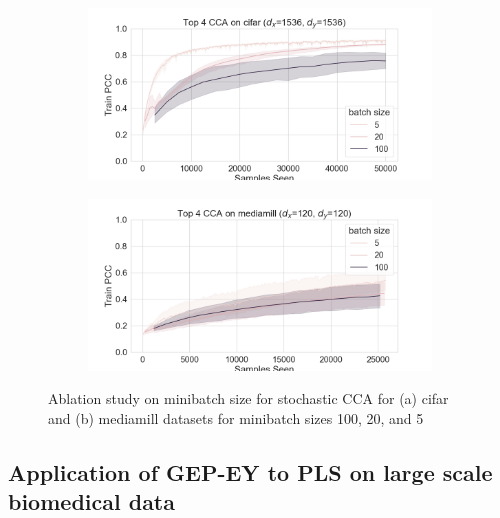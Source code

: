 \begin{figure}[h]
    \centering
    \begin{subfigure}[b]{0.49\textwidth}
        \centering
        \includegraphics[width=\textwidth]{figures/gradient_descent/CCA/cifar_minibatch_size_ablation.png}
        \caption{}
        \label{fig:cifar_minibatch_ablation}
    \end{subfigure}
    \begin{subfigure}[b]{0.49\textwidth}
        \centering
        \includegraphics[width=\textwidth]{figures/gradient_descent/CCA/mediamill_minibatch_size_ablation.png}
        \caption{}
        \label{fig:mediamill_minibatch_ablation}
    \end{subfigure}
    \caption{Ablation study on minibatch size for stochastic CCA for (a) cifar and (b) mediamill datasets for minibatch sizes 100, 20, and 5}
    \label{fig:minibatch size ablation}
\end{figure}

\subsection{Application of GEP-EY to PLS on large scale biomedical data}

